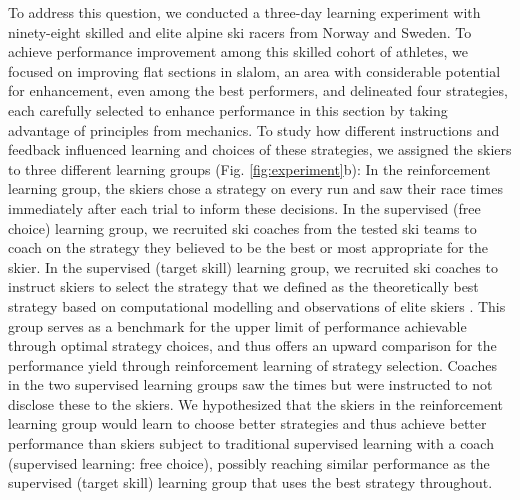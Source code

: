\documentclass[pdflatex,sn-mathphys-num]{sn-jnl}%
\theoremstyle{thmstyleone}%
\theoremstyle{thmstyletwo}%
\theoremstyle{thmstylethree}%
\begin{document}
To address this question, we conducted a three-day learning experiment with ninety-eight skilled and elite alpine ski racers from Norway and Sweden. To achieve performance improvement among this skilled cohort of athletes, we focused on improving flat sections in slalom, an area with considerable potential for enhancement, even among the best performers\cite{supej_new_2011}, and delineated four strategies, each carefully selected to enhance performance in this section by taking advantage of principles from mechanics. To study how different instructions and feedback influenced learning and choices of these strategies, we assigned the skiers to three different learning groups (Fig. \ref{fig:experiment}b): In the reinforcement learning group, the skiers chose a strategy on every run and saw their race times immediately after each trial to inform these decisions. In the supervised (free choice) learning group, we recruited ski coaches from the tested ski teams to coach on the strategy they believed to be the best or most appropriate for the skier. In the supervised (target skill) learning group, we recruited ski coaches to instruct skiers to select the strategy that we defined as the theoretically best strategy based on computational modelling \cite{lind_physics_2013, mote_accelerations_1983, luginbuhl_identification_2023} and observations of elite skiers \cite{reid_alpine_2020, magelssen_is_2022}. This group serves as a benchmark for the upper limit of performance achievable through optimal strategy choices, and thus offers an upward comparison for the performance yield through reinforcement learning of strategy selection. Coaches in the two supervised learning groups saw the times but were instructed to not disclose these to the skiers. We hypothesized that the skiers in the reinforcement learning group would learn to choose better strategies and thus achieve better performance than skiers subject to traditional supervised learning with a coach (supervised learning: free choice), possibly reaching similar performance as the supervised (target skill) learning group that uses the best strategy throughout. 
\end{document}
